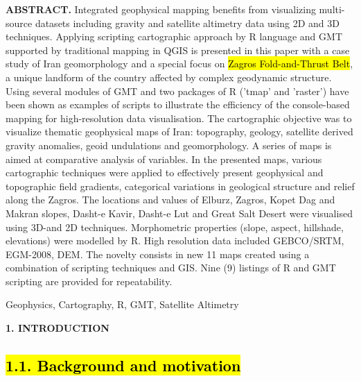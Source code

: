 \documentclass[12pt,a4paper,oneside]{article}
\def \newsection{\vspace{12pt}\textbf}
\def \newpar{\vspace{6pt}}
\begin{document}
{\bf ABSTRACT.} Integrated geophysical mapping benefits from visualizing multi-source datasets including gravity and satellite altimetry data using 2D and 3D techniques. Applying scripting cartographic approach by R language and GMT supported by traditional mapping in QGIS is presented in this paper with a case study of Iran geomorphology and a special focus on \hl{Zagros Fold-and-Thrust Belt}, a unique landform of the country affected by complex geodynamic structure. Using several modules of GMT and two packages of R ('tmap' and 'raster') have been shown as examples of scripts to illustrate the efficiency of the console-based mapping for high-resolution data visualisation. The cartographic objective was to visualize thematic geophysical maps of Iran: topography, geology, satellite derived gravity anomalies, geoid undulations and geomorphology. A series of maps is aimed at comparative analysis of variables. In the presented maps, various cartographic techniques were applied to effectively present geophysical and topographic field gradients, categorical variations in geological structure and relief along the Zagros. The locations and values of Elburz, Zagros, Kopet Dag and Makran slopes, Dasht-e Kavir, Dasht-e Lut and Great Salt Desert were visualised using 3D-and 2D techniques. Morphometric properties (slope, aspect, hillshade, elevations) were modelled by R. High resolution data included GEBCO/SRTM, EGM-2008, DEM. The novelty consists in new 11 maps created using a combination of scripting techniques and GIS. Nine (9) listings of R and GMT scripting are provided for repeatability.

\newpar {\bf Keywords:} Geophysics, Cartography, R, GMT, Satellite Altimetry


\newsection {1. INTRODUCTION}

\subsection*{\hl{1.1. Background and motivation}}
\end{document}
